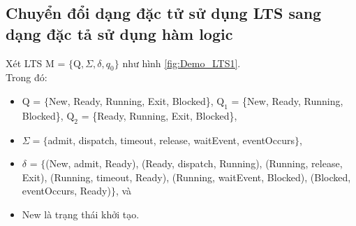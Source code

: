 \documentclass[a4paper,13pt,oneside,openany]{book}
\begin{document}
\begin{flushleft}
	\section{Chuyển đổi dạng đặc tử sử dụng LTS sang dạng đặc tả sử dụng hàm logic}
	Xét LTS M = $\{\textrm{Q}, \Sigma, \delta, q_0\}$ như hình \ref{fig:Demo_LTS1}.\\
	Trong đó:
	\begin{itemize}
		\item Q = $\{$New, Ready, Running, Exit, Blocked\}, $\textrm{Q}_1$ = \{New, Ready, Running, Blocked\}, $\textrm{Q}_2$ = \{Ready, Running, Exit, Blocked\},
		\item $\Sigma = \{$admit, dispatch, timeout, release, waitEvent, eventOccurs$\}$,
		\item $\delta$ = $\{$(New, admit, Ready), (Ready, dispatch, Running), (Running, release, Exit), (Running, timeout, Ready), (Running, waitEvent, Blocked), (Blocked, eventOccurs, Ready)$\}$, và
		\item New là trạng thái khởi tạo.
	\end{itemize}


\end{flushleft}
\end{document}
